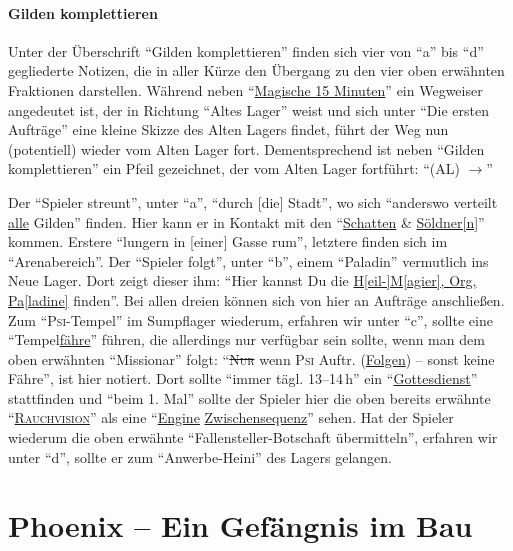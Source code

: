 \documentclass[a5paper,pagesize,numbers=noenddot]{scrbook}
\begin{document}
\subsubsection{Gilden komplettieren}\label{sec:orpheus_geschichte_abschnitte_gilden}
Unter der Überschrift \enquote{Gilden komplettieren} finden sich vier von \enquote{a} bis \enquote{d} gegliederte Notizen, die in aller Kürze den Übergang zu den vier oben erwähnten Fraktionen darstellen.
Während neben \enquote{\uline{Magische 15 Minuten}} ein Wegweiser angedeutet ist, der in Richtung \enquote{Altes Lager} weist und sich unter \enquote{Die ersten Aufträge} eine kleine Skizze des Alten Lagers findet, führt der Weg nun (potentiell) wieder vom Alten Lager fort.
Dementsprechend ist neben \enquote{Gilden komplettieren} ein Pfeil gezeichnet, der vom Alten Lager fortführt: \enquote{(AL) $\rightarrow$}

Der \enquote{Spieler streunt}, unter \enquote{a}, \enquote{durch [die] Stadt}, wo sich \enquote{anderswo verteilt \uline{alle} Gilden} finden.
Hier kann er in Kontakt mit den \enquote{\uline{Schatten} \& \uline{Söldner[n]}} kommen.
Erstere \enquote{lungern in [einer] Gasse rum}, letztere finden sich im \enquote{Arenabereich}.
Der \enquote{Spieler folgt}, unter \enquote{b}, einem \enquote{Paladin} vermutlich ins Neue Lager.
Dort zeigt dieser ihm: \enquote{Hier kannst Du die \uline{H[eil-]M[agier], Org, Pa[ladine]} finden}. %
Bei allen dreien können sich von hier an Aufträge anschließen.
Zum \enquote{\textsc{Psi}-Tempel} im Sumpflager wiederum, erfahren wir unter \enquote{c}, sollte eine \enquote{Tempel\uline{fähre}} führen, die allerdings nur verfügbar sein sollte, wenn man dem oben erwähnten \enquote{Missionar} folgt: \enquote{\sout{\textsc{Nur}} wenn \textsc{Psi} Auftr. (\uline{Folgen}) -- sonst keine Fähre}, ist hier notiert.
Dort sollte \enquote{immer tägl. 13--14\,h} ein \enquote{\uline{Gottesdienst}} stattfinden und \enquote{beim 1. Mal} sollte der Spieler hier die oben bereits erwähnte \enquote{\uline{\textsc{Rauchvision}}} als eine \enquote{\uline{Engine} \uline{Zwischensequenz}} sehen. %
Hat der Spieler wiederum die oben erwähnte \enquote{Fallensteller-Botschaft übermitteln}, erfahren wir unter \enquote{d}, sollte er zum \enquote{Anwerbe-Heini} des Lagers gelangen.


\chapter{Phoenix -- Ein Gefängnis im Bau}\label{ch:phoenix}
\end{document}
